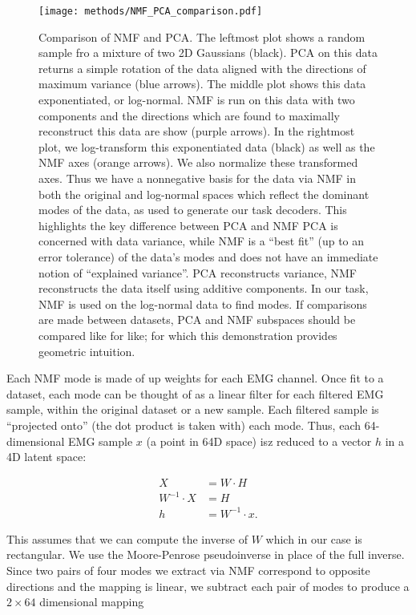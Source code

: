 \documentclass[../main.tex]{subfiles}
\begin{document}
\begin{figure}[!htb]
  \centering
  \texttt{[image: methods/NMF\_PCA\_comparison.pdf]}
  \caption[Comparison of NMF and PCA]{Comparison of NMF and PCA. The leftmost plot shows a random sample fro a mixture of two 2D Gaussians (black). PCA on this data returns a simple rotation of the data aligned with the directions of maximum variance (blue arrows). The middle plot shows this data exponentiated, or log-normal. NMF is run on this data with two components and the directions which are found to maximally reconstruct this data are show (purple arrows). In the rightmost plot, we log-transform this exponentiated data (black) as well as the NMF axes (orange arrows). We also normalize these transformed axes. Thus we have a nonnegative basis for the data via NMF in both the original and log-normal spaces which reflect the dominant modes of the data, as used to generate our task decoders. This highlights the key difference between PCA and NMF\: PCA is concerned with data variance, while NMF is a ``best fit'' (up to an error tolerance) of the data's modes and does not have an immediate notion of ``explained variance''. PCA reconstructs variance, NMF reconstructs the data itself using additive components. In our task, NMF is used on the log-normal data to find modes. If comparisons are made between datasets, PCA and NMF subspaces should be compared like for like; for which this demonstration provides geometric intuition.}\label{fig:nmf_v_pca}
\end{figure}

Each NMF mode is made of up weights for each EMG channel. Once fit to a dataset, each mode can be thought of as a linear filter for each filtered EMG sample, within the original dataset or a new sample. Each filtered sample is ``projected onto'' (the dot product is taken with) each mode. Thus, each 64-dimensional EMG sample $x$ (a point in 64D space) isz reduced to a vector $h$ in a 4D latent space:

\begin{align}
  X &= W\cdot{H} \\
  W^{-1}\cdot{X} &= {H} \\
  h &= W^{-1}\cdot{x}.
\end{align}

This assumes that we can compute the inverse of $W$ which in our case is rectangular. We use the Moore-Penrose pseudoinverse in place of the full inverse. Since two pairs of four modes we extract via NMF correspond to opposite directions and the mapping is linear, we subtract each pair of modes to produce a $2\times{64}$ dimensional mapping
\end{document}
